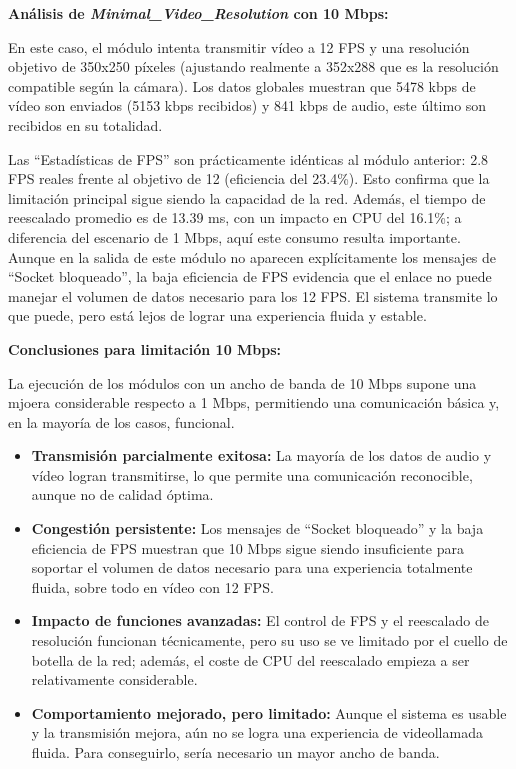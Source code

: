 \vspace{\baselineskip}

\textbf{Análisis de \textit{Minimal\_Video\_Resolution} con 10 Mbps:}
\vspace{\baselineskip}

En este caso, el módulo intenta transmitir vídeo a 12 FPS y una resolución objetivo de 350x250 píxeles (ajustando realmente a 352x288 que es la resolución compatible según la cámara). Los datos globales muestran que 5478 kbps de vídeo son enviados (5153 kbps recibidos) y 841 kbps de audio, este último son recibidos en su totalidad.
\vspace{\baselineskip}

Las ``Estadísticas de FPS'' son prácticamente idénticas al módulo anterior: 2.8 FPS reales frente al objetivo de 12 (eficiencia del 23.4\%). Esto confirma que la limitación principal sigue siendo la capacidad de la red. Además, el tiempo de reescalado promedio es de 13.39 ms, con un impacto en CPU del 16.1\%; a diferencia del escenario de 1 Mbps, aquí este consumo resulta importante. Aunque en la salida de este módulo no aparecen explícitamente los mensajes de ``Socket bloqueado'', la baja eficiencia de FPS evidencia que el enlace no puede manejar el volumen de datos necesario para los 12 FPS. El sistema transmite lo que puede, pero está lejos de lograr una experiencia fluida y estable.
\vspace{\baselineskip}

\textbf{Conclusiones para limitación 10 Mbps:}

La ejecución de los módulos con un ancho de banda de 10 Mbps supone una mjoera considerable respecto a 1 Mbps, permitiendo una comunicación básica y, en la mayoría de los casos, funcional.
\begin{itemize}
    \item \textbf{Transmisión parcialmente exitosa:} La mayoría de los datos de audio y vídeo logran transmitirse, lo que permite una comunicación reconocible, aunque no de calidad óptima.
    \item \textbf{Congestión persistente:} Los mensajes de ``Socket bloqueado'' y la baja eficiencia de FPS muestran que 10 Mbps sigue siendo insuficiente para soportar el volumen de datos necesario para una experiencia totalmente fluida, sobre todo en vídeo con 12 FPS.
    \item \textbf{Impacto de funciones avanzadas:} El control de FPS y el reescalado de resolución funcionan técnicamente, pero su uso se ve limitado por el cuello de botella de la red; además, el coste de CPU del reescalado empieza a ser relativamente considerable.
    \item \textbf{Comportamiento mejorado, pero limitado:} Aunque el sistema es usable y la transmisión mejora, aún no se logra una experiencia de videollamada fluida. Para conseguirlo, sería necesario un mayor ancho de banda.
\end{itemize}

